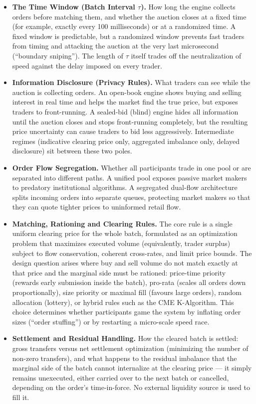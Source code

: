\documentclass[11pt]{article}
\begin{document}
\begin{itemize}
    \item \textbf{The Time Window (Batch Interval $\tau$).} How long the engine collects orders before matching them, and whether the auction closes at a fixed time (for example, exactly every 100 milliseconds) or at a randomized time. A fixed window is predictable, but a randomized window prevents fast traders from timing and attacking the auction at the very last microsecond (``boundary sniping''). The length of $\tau$ itself trades off the neutralization of speed against the delay imposed on every trader.

    \item \textbf{Information Disclosure (Privacy Rules).} What traders can see while the auction is collecting orders. An open-book engine shows buying and selling interest in real time and helps the market find the true price, but exposes traders to front-running. A sealed-bid (blind) engine hides all information until the auction closes and stops front-running completely, but the resulting price uncertainty can cause traders to bid less aggressively. Intermediate regimes (indicative clearing price only, aggregated imbalance only, delayed disclosure) sit between these two poles.

    \item \textbf{Order Flow Segregation.} Whether all participants trade in one pool or are separated into different paths. A unified pool exposes passive market makers to predatory institutional algorithms. A segregated dual-flow architecture splits incoming orders into separate queues, protecting market makers so that they can quote tighter prices to uninformed retail flow.

    \item \textbf{Matching, Rationing and Clearing Rules.} The core rule is a single uniform clearing price for the whole batch, formulated as an optimization problem that maximizes executed volume (equivalently, trader surplus) subject to flow conservation, coherent cross-rates, and limit price bounds. The design question arises where buy and sell volume do not match exactly at that price and the marginal side must be rationed: price-time priority (rewards early submission inside the batch), pro-rata (scales all orders down proportionally), size priority or maximal fill (favours large orders), random allocation (lottery), or hybrid rules such as the CME K-Algorithm. This choice determines whether participants game the system by inflating order sizes (``order stuffing'') or by restarting a micro-scale speed race.

    \item \textbf{Settlement and Residual Handling.} How the cleared batch is settled: gross transfers versus net settlement optimization (minimizing the number of non-zero transfers), and what happens to the residual imbalance that the marginal side of the batch cannot internalize at the clearing price --- it simply remains unexecuted, either carried over to the next batch or cancelled, depending on the order's time-in-force. No external liquidity source is used to fill it.
\end{itemize}
\end{document}
